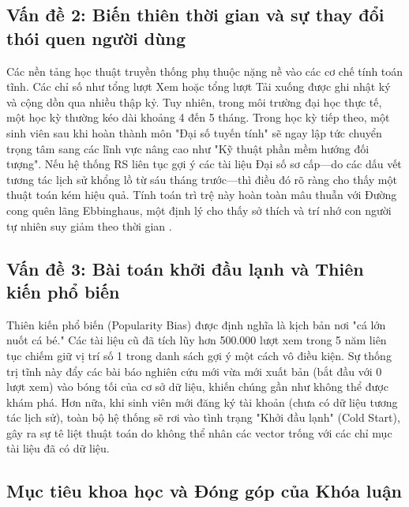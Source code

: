 \documentclass[journal]{IEEEtran}
\begin{document}
\subsection{Vấn đề 2: Biến thiên thời gian và sự thay đổi thói quen người dùng}

Các nền tảng học thuật truyền thống phụ thuộc nặng nề vào các cơ chế tính toán tĩnh. 
Các chỉ số như tổng lượt Xem hoặc tổng lượt Tải xuống được ghi nhật ký và cộng dồn qua nhiều thập kỷ. 
Tuy nhiên, trong môi trường đại học thực tế, một học kỳ thường kéo dài khoảng 4 đến 5 tháng. 
Trong học kỳ tiếp theo, một sinh viên sau khi hoàn thành môn "Đại số tuyến tính" sẽ ngay lập tức chuyển trọng tâm 
sang các lĩnh vực nâng cao như "Kỹ thuật phần mềm hướng đối tượng". 
Nếu hệ thống RS liên tục gợi ý các tài liệu Đại số sơ cấp---do các dấu vết tương tác lịch sử khổng lồ từ sáu tháng trước---thì điều đó rõ ràng cho thấy một thuật toán kém hiệu quả. 
Tính toán trì trệ này hoàn toàn mâu thuẫn với Đường cong quên lãng Ebbinghaus, 
một định lý cho thấy sở thích và trí nhớ con người tự nhiên suy giảm theo thời gian \cite{ebbinghaus_forgetting}.

\subsection{Vấn đề 3: Bài toán khởi đầu lạnh và Thiên kiến phổ biến}

Thiên kiến phổ biến (Popularity Bias) được định nghĩa là kịch bản nơi "cá lớn nuốt cá bé." 
Các tài liệu cũ đã tích lũy hơn 500.000 lượt xem trong 5 năm 
liên tục chiếm giữ vị trí số 1 trong danh sách gợi ý một cách vô điều kiện. 
Sự thống trị tĩnh này đẩy các bài báo nghiên cứu mới vừa mới xuất bản (bắt đầu với 0 lượt xem) 
vào bóng tối của cơ sở dữ liệu, khiến chúng gần như không thể được khám phá. 
Hơn nữa, khi sinh viên mới đăng ký tài khoản (chưa có dữ liệu tương tác lịch sử), 
toàn bộ hệ thống sẽ rơi vào tình trạng "Khởi đầu lạnh" (Cold Start), 
gây ra sự tê liệt thuật toán do không thể nhân các vector trống với các chỉ mục tài liệu đã có dữ liệu.

\subsection{Mục tiêu khoa học và Đóng góp của Khóa luận}
\end{document}
